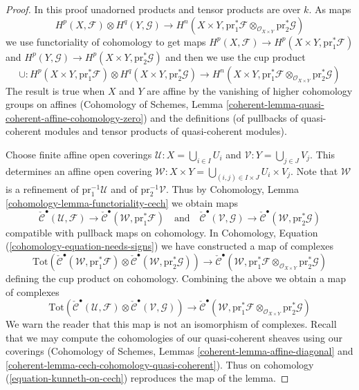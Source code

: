 \begin{proof}
In this proof unadorned products and tensor products are over $k$. As maps
$$
H^p(X, \mathcal{F}) \otimes H^q(Y, \mathcal{G})
\longrightarrow
H^n(X \times Y, \text{pr}_1^*\mathcal{F}
\otimes_{\mathcal{O}_{X \times Y}} \text{pr}_2^*\mathcal{G})
$$
we use functoriality of cohomology to get maps
$H^p(X, \mathcal{F}) \to H^p(X \times Y, \text{pr}_1^*\mathcal{F})$ and
$H^p(Y, \mathcal{G}) \to H^p(X \times Y, \text{pr}_2^*\mathcal{G})$
and then we use the cup product
$$
\cup :
H^p(X \times Y, \text{pr}_1^*\mathcal{F})
\otimes H^q(X \times Y, \text{pr}_2^*\mathcal{G})
\longrightarrow
H^n(X \times Y, \text{pr}_1^*\mathcal{F}
\otimes_{\mathcal{O}_{X \times Y}} \text{pr}_2^*\mathcal{G})
$$
The result is true when $X$ and $Y$ are affine by the vanishing of
higher cohomology groups on affines (Cohomology of Schemes, Lemma
\ref{coherent-lemma-quasi-coherent-affine-cohomology-zero})
and the definitions (of pullbacks of quasi-coherent modules and tensor
products of quasi-coherent modules).

\medskip\noindent
Choose finite affine open coverings
$\mathcal{U} : X = \bigcup_{i \in I} U_i$ and
$\mathcal{V} : Y = \bigcup_{j \in J} V_j$.
This determines an affine open covering
$\mathcal{W} : X \times Y = \bigcup_{(i, j) \in I \times J} U_i \times V_j$.
Note that $\mathcal{W}$ is a refinement of
$\text{pr}_1^{-1}\mathcal{U}$ and of $\text{pr}_2^{-1}\mathcal{V}$.
Thus by Cohomology, Lemma \ref{cohomology-lemma-functoriality-cech}
we obtain maps
$$
\check{\mathcal{C}}^\bullet(\mathcal{U}, \mathcal{F}) \to
\check{\mathcal{C}}^\bullet(\mathcal{W}, \text{pr}_1^*\mathcal{F})
\quad\text{and}\quad
\check{\mathcal{C}}^\bullet(\mathcal{V}, \mathcal{G}) \to
\check{\mathcal{C}}^\bullet(\mathcal{W}, \text{pr}_2^*\mathcal{G})
$$
compatible with pullback maps on cohomology. In Cohomology, Equation
(\ref{cohomology-equation-needs-signs})
we have constructed a map of complexes
$$
\text{Tot}(
\check{\mathcal{C}}^\bullet(\mathcal{W}, \text{pr}_1^*\mathcal{F})
\otimes
\check{\mathcal{C}}^\bullet(\mathcal{W}, \text{pr}_2^*\mathcal{G}))
\longrightarrow
\check{\mathcal{C}}^\bullet(\mathcal{W},
\text{pr}_1^*\mathcal{F} \otimes_{\mathcal{O}_{X \times Y}}
\text{pr}_2^*\mathcal{G})
$$
defining the cup product on cohomology. Combining the above we
obtain a map of complexes
\begin{equation}
\label{equation-kunneth-on-cech}
\text{Tot}(
\check{\mathcal{C}}^\bullet(\mathcal{U}, \mathcal{F})
\otimes
\check{\mathcal{C}}^\bullet(\mathcal{V}, \mathcal{G}))
\longrightarrow
\check{\mathcal{C}}^\bullet(\mathcal{W},
\text{pr}_1^*\mathcal{F} \otimes_{\mathcal{O}_{X \times Y}}
\text{pr}_2^*\mathcal{G})
\end{equation}
We warn the reader that this map is not an isomorphism of
complexes. Recall that we may compute the cohomologies of our
quasi-coherent sheaves using our coverings
(Cohomology of Schemes, Lemmas
\ref{coherent-lemma-affine-diagonal} and
\ref{coherent-lemma-cech-cohomology-quasi-coherent}).
Thus on cohomology (\ref{equation-kunneth-on-cech}) reproduces the map of
the lemma.


\end{proof}
